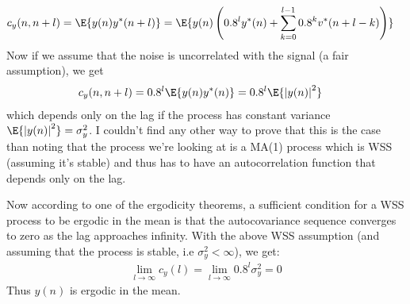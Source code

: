 \begin{align}
	c_y(n,n+l)&=\E{y(n)y^*(n+l)}=\E{y(n)\left(0.8^ly^*(n)+\sum_{k=0}^{l-1}0.8^kv^*(n+l-k)\right)}
\end{align}
Now if we assume that the noise is uncorrelated with the signal (a fair assumption), we get
\begin{align}
	c_y(n,n+l)&=0.8^l\E{y(n)y^*(n)}=0.8^l\E{\left|y(n)\right|^2}
\end{align}
which depends only on the lag if the process has constant variance $\E{\left|y(n)\right|^2}=\sigma_y^2$. I couldn't find
any other way to prove that this is the case than noting that the process we're
looking at is a MA(1) process which is WSS (assuming it's stable) and thus has to have
an autocorrelation function that depends only on the lag.


Now according to one of the ergodicity theorems, a sufficient condition for a WSS process
to be ergodic in the mean is that the autocovariance sequence converges to zero as the lag
approaches infinity. With the above WSS assumption (and assuming that the process is stable, i.e $\sigma_y^2<\infty$), we get:
\begin{align}
	\lim_{l\to\infty}c_y(l)=\lim_{l\to\infty}0.8^l\sigma_y^2=0
\end{align}
Thus $y(n)$ is ergodic in the mean.






